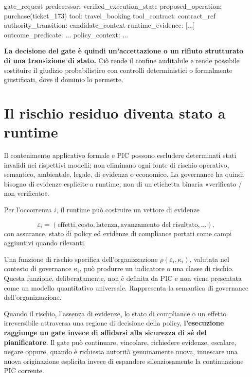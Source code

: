 \documentclass[10pt,oneside,openany]{book}
\begin{document}
\begin{codeblock}
gate_request {
  predecessor: verified_execution_state
  proposed_operation: purchase(ticket_173)
  tool: travel_booking
  tool_contract: contract_ref
  authority_transition: candidate_context
  runtime_evidence: [...]
  outcome_predicate: ...
  policy_context: ...
}
\end{codeblock}

\textbf{La decisione del gate è quindi un'accettazione o un rifiuto strutturato di una transizione di stato.} Ciò rende il confine auditabile e rende possibile sostituire il giudizio probabilistico con controlli deterministici o formalmente giustificati, dove il dominio lo permette.

\section{Il rischio residuo diventa stato a runtime}
Il contenimento applicativo formale e PIC possono escludere determinati stati invalidi nei rispettivi modelli; non eliminano ogni fonte di rischio operativo, semantico, ambientale, legale, di evidenza o economico. La governance ha quindi bisogno di evidenze esplicite a runtime, non di un'etichetta binaria «verificato / non verificato».

Per l'occorrenza $i$, il runtime può costruire un vettore di evidenze

\[
\varepsilon_i=(\text{effetti},\text{costo},\text{latenza},\text{avanzamento del risultato},\ldots),
\]
con assurance, stato di policy ed evidenze di compliance portati come campi aggiuntivi quando rilevanti.

Una funzione di rischio specifica dell'organizzazione $\rho(\varepsilon_i,\kappa_i)$, valutata nel contesto di governance $\kappa_i$, può produrre un indicatore o una classe di rischio. Questa funzione, deliberatamente, non è definita da PIC e non viene presentata come un modello quantitativo universale. Rappresenta la semantica di governance dell'organizzazione.

Quando il rischio, l'assenza di evidenze, lo stato di compliance o un effetto irreversibile attraversa una regione di decisione della policy, \textbf{l'esecuzione raggiunge un gate invece di affidarsi alla sicurezza di sé del pianificatore}. Il gate può continuare, vincolare, richiedere evidenze, escalare, negare oppure, quando è richiesta autorità genuinamente nuova, innescare una nuova originazione esplicita invece di espandere silenziosamente la continuazione PIC corrente.
\end{document}
